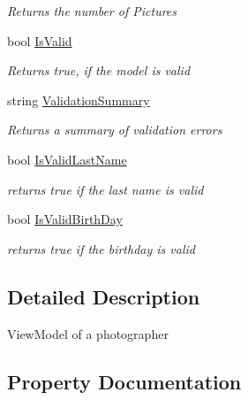 \begin{DoxyCompactItemize}
\begin{DoxyCompactList}\small\item\em Returns the number of Pictures \end{DoxyCompactList}\item 
bool \mbox{\hyperlink{class_pic_d_b_1_1_models_1_1_photographer_view_model_a08ab8948b5cd0c1921bd8e5c9bacd4a2}{Is\+Valid}}
\begin{DoxyCompactList}\small\item\em Returns true, if the model is valid \end{DoxyCompactList}\item 
string \mbox{\hyperlink{class_pic_d_b_1_1_models_1_1_photographer_view_model_a03e3fe541dbcf267d42c837941109249}{Validation\+Summary}}
\begin{DoxyCompactList}\small\item\em Returns a summary of validation errors \end{DoxyCompactList}\item 
bool \mbox{\hyperlink{class_pic_d_b_1_1_models_1_1_photographer_view_model_a0b9eac0711cebf715896298bcb0ada58}{Is\+Valid\+Last\+Name}}
\begin{DoxyCompactList}\small\item\em returns true if the last name is valid \end{DoxyCompactList}\item 
bool \mbox{\hyperlink{class_pic_d_b_1_1_models_1_1_photographer_view_model_a6fc4319fb38c1d4b6281fc786099d9ef}{Is\+Valid\+Birth\+Day}}
\begin{DoxyCompactList}\small\item\em returns true if the birthday is valid \end{DoxyCompactList}\end{DoxyCompactItemize}


\subsection{Detailed Description}
View\+Model of a photographer 



\subsection{Property Documentation}
\mbox{\label{class_pic_d_b_1_1_models_1_1_photographer_view_model_ada37c319eff23f8b0c039e0d06b520b9}} 
